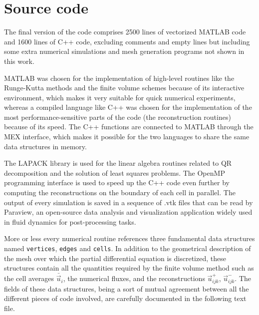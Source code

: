 \lstset{inputpath = ../MATLAB}
\graphicspath{{./figures/chapter4/}}

\chapter{Source code} \label{ch:appendix-source-code}

The final version of the code comprises 2500 lines of vectorized MATLAB code and
1600 lines of C++ code, excluding comments and empty lines
but including some extra numerical simulations and mesh generation programs
not shown in this work.

MATLAB was chosen for the implementation of high-level routines like
the Runge-Kutta methods and the finite volume schemes because
of its interactive environment, which makes it very suitable for
quick numerical experiments, whereas a compiled language like C++
was chosen for the implementation of the most performance-sensitive
parts of the code (the reconstruction routines) because of its speed.
The C++ functions are connected to MATLAB through the MEX interface,
which makes it possible for the two languages to share the same data
structures in memory.

The LAPACK library is used for the linear algebra routines related to
QR decomposition and the solution of least squares problems.
The OpenMP programming interface is used to speed up
the C++ code even further by computing the reconstructions on the
boundary of each cell in parallel.
The output of every simulation is saved in a sequence of .vtk files
that can be read by Paraview, an open-source data analysis and visualization
application widely used in fluid dynamics for post-processing tasks.

More or less every numerical routine references three fundamental data structures
named \texttt{vertices}, \texttt{edges} and \texttt{cells}.
In addition to the geometrical description of the mesh over which the partial
differential equation is discretized, these structures contain all the quantities
required by the finite volume method such as the cell averages $\bar{\vec{u}}_i$,
the numerical fluxes, and the reconstructions $\vec{u}_{ijk}^+$, $\vec{u}_{ijk}^-$.
The fields of these data structures, being a sort of mutual agreement between
all the different pieces of code involved, are carefully documented in the
following text file. \\


\vspace{1em}

